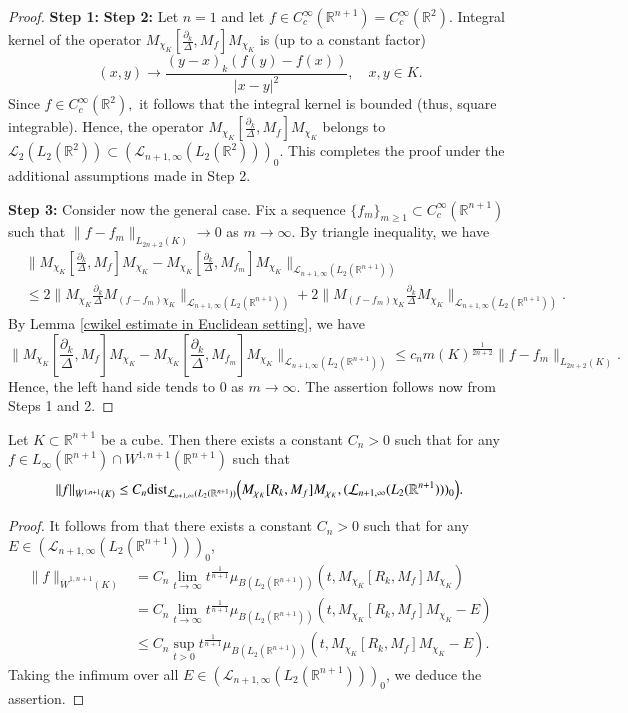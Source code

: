 \documentclass[12pt]{amsart}
\begin{document}
\begin{proof} {\bf Step 1:}
{\bf Step 2:} Let $n=1$ and let $f\in C^{\infty}_c(\mathbb{R}^{n+1})=C^{\infty}_c(\mathbb{R}^2).$ Integral kernel of the operator $M_{\chi_K}[\frac{\partial_k}{\Delta},M_f]M_{\chi_K}$ is (up to a constant factor)
$$(x,y)\to\frac{(y-x)_k(f(y)-f(x))}{|x-y|^2},\quad x,y\in K.$$
Since $f\in C^{\infty}_c(\mathbb{R}^2),$ it follows that the integral kernel is bounded (thus, square integrable).  Hence, the operator $M_{\chi_K}[\frac{\partial_k}{\Delta},M_f]M_{\chi_K}$ belongs to $\mathcal{L}_2(L_2(\mathbb{R}^2))\subset (\mathcal{L}_{n+1,\infty}(L_2(\mathbb{R}^2)))_0.$ This completes the proof under the additional assumptions made in Step 2.

{\bf Step 3:} Consider now the general case. Fix a sequence $\{f_m\}_{m\geq1}\subset C^{\infty}_c(\mathbb{R}^{n+1})$ such that $\|f-f_m\|_{L_{2n+2}(K)}\to0$ as $m\to\infty.$ By triangle inequality, we have
\begin{align*}
&\|M_{\chi_K}[\frac{\partial_k}{\Delta},M_f]M_{\chi_K}-M_{\chi_K}[\frac{\partial_k}{\Delta},M_{f_m}]M_{\chi_K}\|_{\mathcal{L}_{n+1,\infty}(L_2(\mathbb{R}^{n+1}))}\\
&\leq 2\|M_{\chi_K}\frac{\partial_k}{\Delta}M_{(f-f_m) \chi_K}\|_{\mathcal{L}_{n+1,\infty}(L_2(\mathbb{R}^{n+1}))}+2\|M_{(f-f_m)\chi_K}\frac{\partial_k}{\Delta}M_{\chi_K}\|_{\mathcal{L}_{n+1,\infty}(L_2(\mathbb{R}^{n+1}))}.
\end{align*}
By Lemma \ref{cwikel estimate in Euclidean setting}, we have
$$\|M_{\chi_K}[\frac{\partial_k}{\Delta},M_f]M_{\chi_K}-M_{\chi_K}[\frac{\partial_k}{\Delta},M_{f_m}]M_{\chi_K}\|_{\mathcal{L}_{n+1,\infty}(L_2(\mathbb{R}^{n+1}))}\leq c_nm(K)^{\frac1{2n+2}}\|f-f_m\|_{L_{2n+2}(K)}.$$
Hence, the left hand side tends to $0$ as $m\to\infty.$ The assertion follows now from Steps 1 and 2.
\end{proof}

\begin{lemma}\label{first distance lemma} Let $K\subset\mathbb{R}^{n+1}$ be a cube. Then there exists a constant $C_n>0$ such that for any $f\in L_{\infty}(\mathbb{R}^{n+1})\cap W^{1,n+1}(\mathbb{R}^{n+1})$ such that
$$\|f\|_{\dot{W}^{1,n+1}(K)}\leq C_n{\rm dist}_{\mathcal{L}_{n+1,\infty}(L_2(\mathbb{R}^{n+1}))}\Big(M_{\chi_K}[R_k,M_f]M_{\chi_K},(\mathcal{L}_{n+1,\infty}(L_2(\mathbb{R}^{n+1})))_0\Big).$$
\end{lemma}
\begin{proof}
It follows from \cite[Proposition 8.6]{MR4549699} that there exists a constant $C_n>0$ such that for any $E\in (\mathcal{L}_{n+1,\infty}(L_2(\mathbb{R}^{n+1})))_0$,
\begin{align*}
\|f\|_{\dot{W}^{1,n+1}(K)}&=C_n \lim_{t\to\infty}t^{\frac1{n+1}}\mu_{B(L_2(\mathbb{R}^{n+1}))}(t,M_{\chi_K}[R_k,M_f]M_{\chi_K})\\
&=C_n \lim_{t\to\infty}t^{\frac1{n+1}}\mu_{B(L_2(\mathbb{R}^{n+1}))}(t,M_{\chi_K}[R_k,M_f]M_{\chi_K}-E)\\
&\leq C_n \sup_{t>0}t^{\frac1{n+1}}\mu_{B(L_2(\mathbb{R}^{n+1}))}(t,M_{\chi_K}[R_k,M_f]M_{\chi_K}-E).
\end{align*}
Taking the infimum over all $E\in (\mathcal{L}_{n+1,\infty}(L_2(\mathbb{R}^{n+1})))_0$, we deduce the assertion.
\end{proof}
\end{document}
